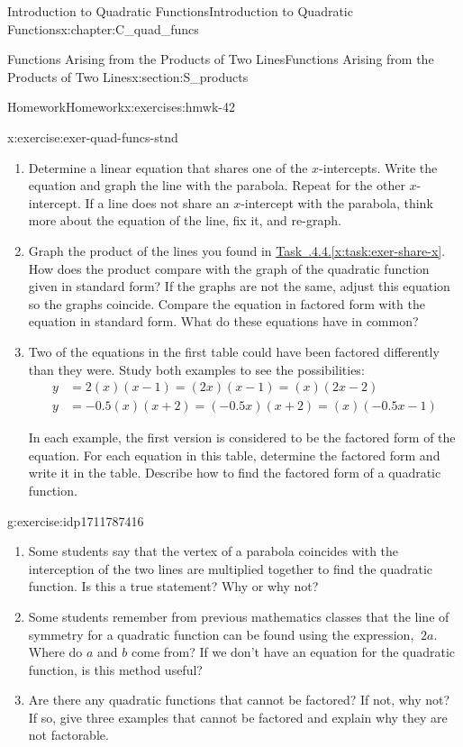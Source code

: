 \documentclass[oneside,10pt,]{book}
\newcommand{\xreffont}{\relax}
\numberwithin{equation}{chapter}
\newcommand{\amp}{&}
\begin{document}
\begin{chapterptx}{Introduction to Quadratic Functions}{}{Introduction to Quadratic Functions}{}{}{x:chapter:C_quad_funcs}
\begin{sectionptx}{Functions Arising from the Products of Two Lines}{}{Functions Arising from the Products of Two Lines}{}{}{x:section:S_products}
\begin{exercises-subsection}{Homework}{}{Homework}{}{}{x:exercises:hmwk-42}
\begin{divisionexercise}{4}{}{}{x:exercise:exer-quad-funcs-stnd}
\begin{enumerate}[font=\bfseries,label=(\alph*),ref=\alph*]
\item\label{x:task:exer-share-x}Determine a linear equation that shares one of the \(x\)-intercepts. Write the equation and graph the line with the parabola. Repeat for the other \(x\)-intercept. If a line does not share an \(x\)-intercept with the parabola, think more about the equation of the line, fix it, and re-graph.%
\item{}Graph the product of the lines you found in \hyperref[x:task:exer-share-x]{Task~{\xreffont 4.2.4.4}.{\xreffont\ref{x:task:exer-share-x}}}. How does the product compare with the graph of the quadratic function given in standard form? If the graphs are not the same, adjust this equation so the graphs coincide. Compare the equation in factored form with the equation in standard form. What do these equations have in common?%
\item{}Two of the equations in the first table could have been factored differently than they were. Study both examples to see the possibilities:%
\begin{align*}
y \amp = 2(x)(x - 1) = (2x)(x - 1) = (x)(2x - 2)\\
y \amp = -0.5(x)(x + 2) = (-0.5x)(x + 2) = (x)(-0.5x - 1)
\end{align*}
%
\par
In each example, the first version is considered to be the factored form of the equation. For each equation in this table, determine the factored form and write it in the table. Describe how to find the factored form of a quadratic function.%
\end{enumerate}
\end{divisionexercise}%
\begin{divisionexercise}{5}{}{}{g:exercise:idp1711787416}%
\begin{enumerate}[font=\bfseries,label=(\alph*),ref=\alph*]
\item{}Some students say that the vertex of a parabola coincides with the interception of the two lines are multiplied together to find the quadratic function. Is this a true statement? Why or why not?%
\item{}Some students remember from previous mathematics classes that the line of symmetry for a quadratic function can be found using the expression, \(\
2a\). Where do \(a\) and \(b\) come from? If we don't have an equation for the quadratic function, is this method useful?%
\item{}Are there any quadratic functions that cannot be factored? If not, why not? If so, give three examples that cannot be factored and explain why they are not factorable.%

\end{enumerate}
\end{divisionexercise}
\end{exercises-subsection}
\end{sectionptx}
\end{chapterptx}
\end{document}
